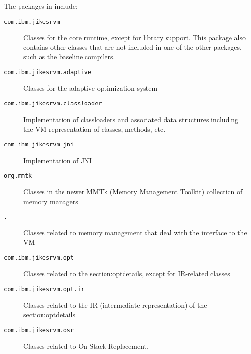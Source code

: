 The packages in \jrvm{} include:
\begin{description}
\item[\texttt{com.ibm.jikesrvm}] Classes for the core runtime, except for library
support.  This package also contains other classes that are not
included in one of the other packages, such as the baseline compilers. 

\item[\texttt{com.ibm.jikesrvm.adaptive}] Classes for the adaptive optimization system

\item[\texttt{com.ibm.jikesrvm.classloader}] Implementation of classloaders
and associated data structures including the VM representation of classes,
methods, etc. 

\item[\texttt{com.ibm.jikesrvm.jni}] Implementation of JNI

\item[\texttt{org.mmtk}] Classes in the newer MMTk
(Memory Management Toolkit) collection of memory managers

\item[\texttt{\MMpackage\-.\mminterface{}}] Classes related to
memory management that deal with the interface to the VM

\item[\texttt{com.ibm.jikesrvm.opt}] Classes related to
the %
{section:optdetails}, except for IR-related classes

\item[\texttt{com.ibm.jikesrvm.opt.ir}] Classes related to the IR
(intermediate representation) of the %
{section:optdetails}

\item[\texttt{com.ibm.jikesrvm.osr}] Classes related to On-Stack-Replacement. 


\end{description}
